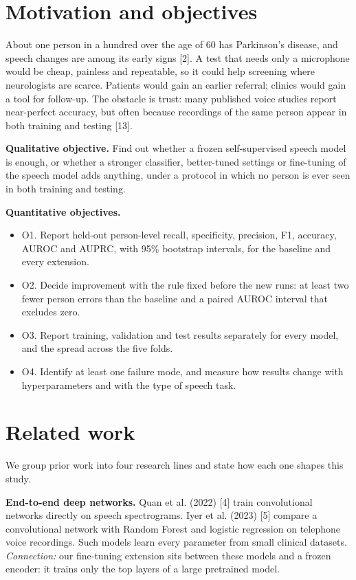 \documentclass[11pt,a4paper]{article}
\begin{document}
\section{Motivation and objectives}\label{sec:motivation}
About one person in a hundred over the age of 60 has Parkinson's disease, and speech changes are among its early signs [2]. A test that needs only a microphone would be cheap, painless and repeatable, so it could help screening where neurologists are scarce. Patients would gain an earlier referral; clinics would gain a tool for follow-up. The obstacle is trust: many published voice studies report near-perfect accuracy, but often because recordings of the same person appear in both training and testing [13].

\textbf{Qualitative objective.} Find out whether a frozen self-supervised speech model is enough, or whether a stronger classifier, better-tuned settings or fine-tuning of the speech model adds anything, under a protocol in which no person is ever seen in both training and testing.

\textbf{Quantitative objectives.}

\begin{itemize}\item O1. Report held-out person-level recall, specificity, precision, F1, accuracy, AUROC and AUPRC, with 95\% bootstrap intervals, for the baseline and every extension.
\item O2. Decide improvement with the rule fixed before the new runs: at least two fewer person errors than the baseline and a paired AUROC interval that excludes zero.
\item O3. Report training, validation and test results separately for every model, and the spread across the five folds.
\item O4. Identify at least one failure mode, and measure how results change with hyperparameters and with the type of speech task.
\end{itemize}
\section{Related work}\label{sec:related}
We group prior work into four research lines and state how each one shapes this study.

\textbf{End-to-end deep networks.} Quan et al. (2022) [4] train convolutional networks directly on speech spectrograms. Iyer et al. (2023) [5] compare a convolutional network with Random Forest and logistic regression on telephone voice recordings. Such models learn every parameter from small clinical datasets. \emph{Connection:} our fine-tuning extension sits between these models and a frozen encoder: it trains only the top layers of a large pretrained model.
\end{document}
